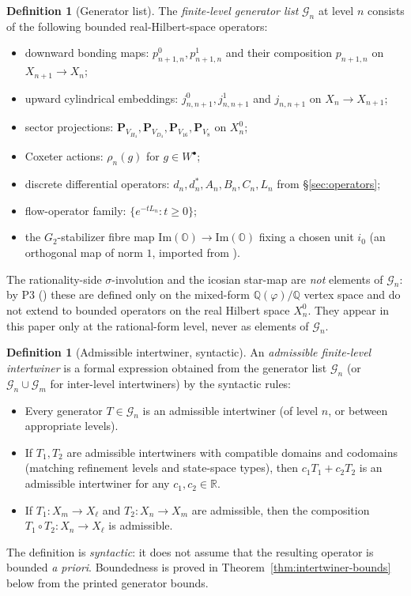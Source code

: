 \documentclass[11pt, a4paper]{amsart}
\theoremstyle{definition}
\newtheorem{definition}[theorem]{Definition}
\newcommand{\R}{\mathbb{R}}
\newcommand{\Q}{\mathbb{Q}}
\newcommand{\OO}{\mathbb{O}}
\renewcommand{\Im}{\mathrm{Im}}
\begin{document}
\begin{definition}[Generator list]
\label{def:generators}
The \emph{finite-level generator list} $\mathcal{G}_n$ at level
$n$ consists of the following bounded real-Hilbert-space operators:
\begin{itemize}
\item downward bonding maps: $p_{n+1, n}^0, p_{n+1, n}^1$ and
  their composition $p_{n+1, n}$ on $X_{n+1} \to X_n$;
\item upward cylindrical embeddings: $j_{n, n+1}^0, j_{n, n+1}^1$
  and $j_{n, n+1}$ on $X_n \to X_{n+1}$;
\item sector projections: $\mathbf{P}_{V_{H_4}},
  \mathbf{P}_{V_{D_4}}, \mathbf{P}_{V_{16}}, \mathbf{P}_{V_8}$ on
  $X_n^0$;
\item Coxeter actions: $\rho_n(g)$ for $g \in W^\bullet$;
\item discrete differential operators: $d_n, d_n^*, A_n, B_n, C_n,
  L_n$ from \S\ref{sec:operators};
\item flow-operator family: $\{e^{-t L_n} : t \geq 0\}$;
\item the $G_2$-stabilizer fibre map $\Im(\OO) \to \Im(\OO)$
  fixing a chosen unit $i_0$ (an orthogonal map of norm $1$,
  imported from \cite{AlgebraicSubstrate}).
\end{itemize}
The rationality-side $\sigma$-involution and the icosian star-map
are \emph{not} elements of $\mathcal{G}_n$: by P3
(\cite[Definition~\texttt{def:sigma}, Theorem~\texttt{thm:commute}]
{RefinementSpaces}) these are defined only on the mixed-form
$\Q(\varphi)/\Q$ vertex space and do not extend to bounded
operators on the real Hilbert space $X_n^0$. They appear in
this paper only at the rational-form level, never as elements
of $\mathcal{G}_n$.
\end{definition}

\begin{definition}[Admissible intertwiner, syntactic]
\label{def:admissible}
An \emph{admissible finite-level intertwiner} is a formal
expression obtained from the generator list $\mathcal{G}_n$ (or
$\mathcal{G}_n \cup \mathcal{G}_m$ for inter-level intertwiners)
by the syntactic rules:
\begin{itemize}
\item Every generator $T \in \mathcal{G}_n$ is an admissible
  intertwiner (of level $n$, or between appropriate levels).
\item If $T_1, T_2$ are admissible intertwiners with compatible
  domains and codomains (matching refinement levels and state-space
  types), then $c_1 T_1 + c_2 T_2$ is an admissible intertwiner
  for any $c_1, c_2 \in \R$.
\item If $T_1 \colon X_m \to X_\ell$ and $T_2 \colon X_n \to X_m$
  are admissible, then the composition $T_1 \circ T_2 \colon X_n
  \to X_\ell$ is admissible.
\end{itemize}
The definition is \emph{syntactic}: it does not assume that the
resulting operator is bounded \emph{a priori}. Boundedness is
proved in Theorem~\ref{thm:intertwiner-bounds} below from the
printed generator bounds.
\end{definition}
\end{document}
